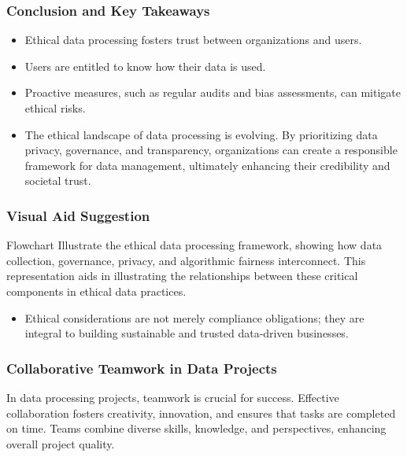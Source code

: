 \documentclass[aspectratio=169]{beamer}
\begin{document}
\begin{frame}[fragile]
    \frametitle{Conclusion and Key Takeaways}
    \begin{itemize}
        \item Ethical data processing fosters trust between organizations and users.
        \item Users are entitled to know how their data is used.
        \item Proactive measures, such as regular audits and bias assessments, can mitigate ethical risks.
        \item The ethical landscape of data processing is evolving. By prioritizing data privacy, governance, and transparency, organizations can create a responsible framework for data management, ultimately enhancing their credibility and societal trust.
    \end{itemize}
\end{frame}

\begin{frame}[fragile]
    \frametitle{Visual Aid Suggestion}
    \begin{block}{Flowchart}
        Illustrate the ethical data processing framework, showing how data collection, governance, privacy, and algorithmic fairness interconnect. This representation aids in illustrating the relationships between these critical components in ethical data practices.
    \end{block}
    \begin{itemize}
        \item Ethical considerations are not merely compliance obligations; they are integral to building sustainable and trusted data-driven businesses.
    \end{itemize}
\end{frame}

\begin{frame}[fragile]
    \frametitle{Collaborative Teamwork in Data Projects}
    In data processing projects, teamwork is crucial for success. 
    Effective collaboration fosters creativity, innovation, and ensures that tasks are completed on time. 
    Teams combine diverse skills, knowledge, and perspectives, enhancing overall project quality.
\end{frame}
\end{document}
